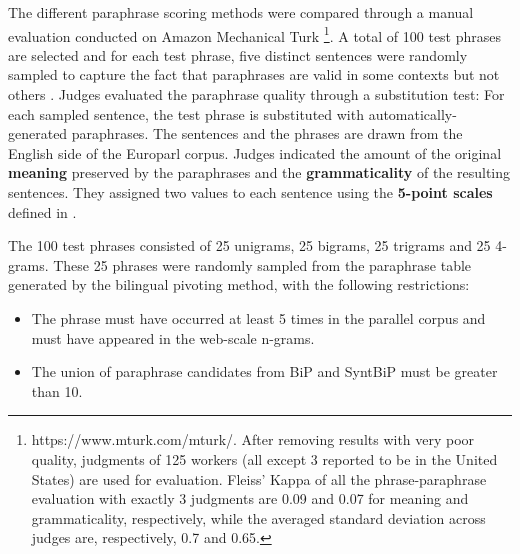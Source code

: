 \documentclass[11pt]{article}
\begin{document}
The different paraphrase scoring methods were compared through a manual evaluation conducted on Amazon Mechanical Turk \footnote{https://www.mturk.com/mturk/. After %
removing results with very poor quality, judgments of 125 workers (all except 3 reported to be in the United States) are used for evaluation. Fleiss' Kappa of all the phrase-paraphrase evaluation with exactly 3 judgments are 0.09 and 0.07 for meaning and grammaticality, respectively, %
while the averaged standard deviation across judges are, respectively, 0.7 and 0.65.}. A total of 100 test phrases are selected and for each test phrase, five distinct sentences were randomly sampled to capture the fact that paraphrases are valid in some contexts but not others \cite{Szpektor2007}.
%
Judges evaluated the paraphrase quality through a substitution test: For each sampled sentence, the test phrase is substituted with automatically-generated paraphrases.  The sentences and the phrases are drawn from the English side of the Europarl corpus.  %
Judges indicated the amount of the original {\bf meaning} preserved by the paraphrases and the {\bf grammaticality} of the resulting sentences.  They assigned two values to each sentence using the {\bf 5-point scales} defined in %
.

The 100 test phrases consisted of 25 unigrams, 25 bigrams, 25 trigrams and 25 4-grams.  These  25 phrases were randomly sampled from the paraphrase table generated by the bilingual pivoting method, with the following restrictions: 

\vspace{-.1cm}
\begin{itemize}
\vspace{-.1cm}
\item The phrase must have occurred at least 5 times in the parallel corpus and must have appeared in the web-scale n-grams.
\vspace{-.1cm}
\item The union of paraphrase candidates from BiP and SyntBiP must be greater than 10.
\vspace{-.1cm}
\end{itemize}
\end{document}
